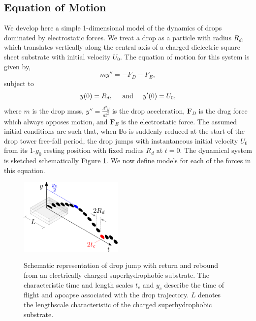 \documentclass[aip,reprint, floatfix]{revtex4-1}
\begin{document}
\subsection{Equation of Motion}
We develop here a simple 1-dimensional model of the dynamics of drops dominated by electrostatic forces. We treat a drop as a particle with radius $R_d$, which translates vertically along the central axis of a charged dielectric square sheet substrate with initial velocity $U_0$. The equation of motion for this system is given by,
\begin{equation}
m y'' = - F_D - F_E,
\label{gov_eqn}
\end{equation}
subject to
\begin{equation}
y(0) = R_d, \hspace{5 mm} \mbox{and} \hspace{5 mm} y'(0) = U_0,
\end{equation}
where $m$ is the drop mass, $y'' = \frac{d^2 y}{d t^2}$ is the drop acceleration, $\mathbf{F}_D$ is the drag force which always opposes motion, and $\mathbf{F}_E$ is the electrostatic force. The assumed initial conditions are such that, when $\mathbb{B}\mbox{o}$ is suddenly reduced at the start of the drop tower free-fall period, the drop jumps with instantaneous initial velocity $U_0$ from its 1-$g_0$ resting position with fixed radius $R_d$ at $t=0$. The dynamical system is sketched schematically Figure \ref{apparatus}. We now define models for each of the forces in this equation.

\begin{figure}[ht]
\centering
\includegraphics[width=0.45\textwidth]{../figures/apparatus3.pdf}
\label{apparatus}
\caption{Schematic representation of drop jump with return and rebound from an electrically charged superhydrophobic substrate. The characteristic time and length scales $t_c$ and $y_c$ describe the time of flight and apoapse associated with the drop trajectory. $L$ denotes the lengthscale characteristic of the charged superhydrophobic substrate.}
\end{figure}
\end{document}
